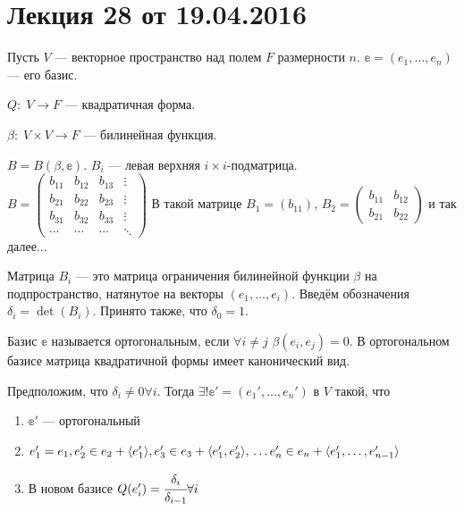 


\renewcommand{\f}{\mathbb{f}}

\section{Лекция 28 от 19.04.2016}

\par Пусть $V$ --- векторное пространство над полем $F$ размерности $n$. $\mathbb{e} = (e_1, \ldots, e_n)$ --- его базис.
\par $Q\colon \; V \to F$ --- квадратичная форма.
\par $\beta\colon\; V\times V \to F$ --- билинейная функция.
\par $B = B(\beta, \mathbb{e})$. $B_i$ --- левая верхняя $i\times i$-подматрица.\\
$B = \begin{pmatrix}
	b_{11}& b_{12} & b_{13} & \vdots\\
	b_{21}& b_{22} & b_{23} & \vdots\\
	b_{31}& b_{32}& b_{33} & \vdots\\
	\cdots& \cdots& \cdots& \ddots
\end{pmatrix}$
В такой матрице $B_1 = (b_{11})$, $B_2 = \begin{pmatrix}
	b_{11}& b_{12}\\
	b_{21}& b_{22}
\end{pmatrix}$
и так далее...
\par Матрица $B_i$ --- это матрица ограничения билинейной функции $\beta$ на подпространство, натянутое на векторы $(e_1, \ldots, e_i)$. Введём обозначения $\delta_i = \det(B_i)$. Принято также, что $\delta_0 = 1$. 
\begin{Def}
	Базис $\mathbb{e}$ называется ортогональным, если $\forall i\neq j$ $\beta(e_i, e_j) = 0$. В ортогональном базисе матрица квадратичной формы имеет канонический вид.
\end{Def}
\begin{Theorem}
		Предположим, что $\delta_i \neq 0 \forall i$. Тогда $\exists ! \mathbb{e}' = (e_1', \ldots, e_n')$ в $V$ такой, что
		\begin{enumerate}
			\item $\mathbb{e}'$ --- ортогональный
			\item $e_1' = e_1,\\ e_2' \in e_2 + \langle e_1'\rangle,\\ e_3' \in  e_3 + \langle e_1', e_2' \rangle,\\ \ldots\\ e_n' \in  e_n + \langle e_1', \ldots, e_{n-1}'\rangle$
			\item В новом базисе $Q(e_i') = \cfrac{\delta_i}{\delta_{i-1}}\forall i$
		\end{enumerate}	
\end{Theorem}
